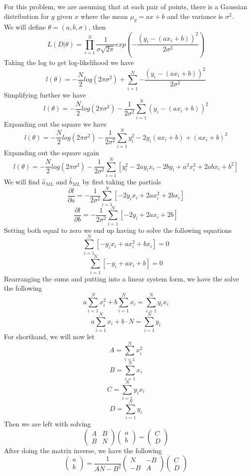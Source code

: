 \documentclass[11pt,psfig]{article}
\begin{document}
For this problem, we are assuming that at each pair of points, there is a Gaussian distribution for $y$ given $x$ where the mean $\mu_y = ax+b$ and the variance is $\sigma^2$.
\\
We will define $\theta=(a,b,\sigma)$, then
\[
L(D|\theta) = \prod_{i=1}^N{ \frac{1}{\sigma \sqrt{2\pi}} exp(-\frac{(y_i - (ax_i + b))^2}{2\sigma^2})}
\]
Taking the log to get log-likelihood we have
\[
l(\theta) = -\frac{N}{2} log(2\pi \sigma^2) + \sum_{i=1}^N{-\frac{(y_i - (ax_i + b))^2}{2\sigma^2}}
\]
Simplifying further we have
\[
l(\theta) = -\frac{N}{2} log(2\pi \sigma^2) - \frac{1}{2\sigma^2} \sum_{i=1}^N{(y_i - (ax_i + b))^2}
\]
Expanding out the square we have
\[
l(\theta) = -\frac{N}{2} log(2\pi \sigma^2) - \frac{1}{2\sigma^2} \sum_{i=1}^N{y_i^2 -2y_i (ax_i + b) + (ax_i + b)^2}
\]
Expanding out the square again
\[
l(\theta) = -\frac{N}{2} log(2\pi \sigma^2) - \frac{1}{2\sigma^2} \sum_{i=1}^N{[y_i^2 -2ay_i x_i -2by_i + a^2 x_i^2 + 2abx_i + b^2]}
\]
We will find $\hat{a}_{ML}$ and $\hat{b}_{ML}$ by first taking the partials
\[
\frac{\partial l}{\partial a} = - \frac{1}{2\sigma^2} \sum_{i=1}^N{[-2y_i x_i + 2a x_i^2 + 2bx_i]}
\]
\[
\frac{\partial l}{\partial b} = - \frac{1}{2\sigma^2} \sum_{i=1}^N{[-2y_i + 2a x_i + 2b]}
\]
Setting both equal to zero we end up having to solve the following equations
\[
\sum_{i=1}^N{[-y_i x_i + a x_i^2 + bx_i]} = 0
\]
\[
\sum_{i=1}^N{[-y_i + a x_i + b]} = 0
\]
Rearranging the sums and putting into a linear system form, we have the solve the following
\[
a\sum_{i=1}^N{x_i^2} + b\sum_{i=1}^N{x_i} = \sum_{i=1}^N{y_i x_i}
\]
\[
a\sum_{i=1}^N{x_i} + b \cdot N = \sum_{i=1}^N{y_i}
\]
For shorthand, we will now let
\[
A = \sum_{i=1}^N{x_i^2}
\]
\[
B = \sum_{i=1}^N{x_i}
\]
\[
C = \sum_{i=1}^N{y_i x_i}
\]
\[
D = \sum_{i=1}^N{y_i}
\]
Then we are left with solving
\[ \left( \begin{array}{ccc}
A & B \\
B & N \end{array} \right)
\left( \begin{array}{ccc}
a \\
b \end{array} \right)=
\left( \begin{array}{ccc}
C \\
D \end{array} \right)\]
After doing the matrix inverse, we have the following 
\[ 
\left( \begin{array}{ccc}
a \\
b \end{array} \right) =
\frac{1}{AN - B^2}
\left( \begin{array}{ccc}
N & -B \\
-B & A \end{array} \right)
\left( \begin{array}{ccc}
C \\
D \end{array} \right)
\]
\end{document}
